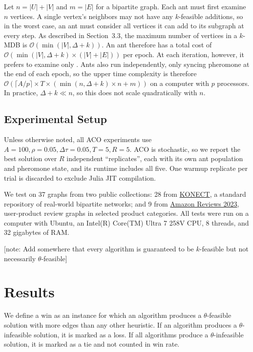 \documentclass[conference]{IEEEtran}
\begin{document}
Let $n = |U| + |V|$ and $m = |E|$ for a bipartite graph. Each ant must first examine $n$ vertices. A single vertex's neighbors may not have any $k$-feasible additions, so in the worst case, an ant must consider all vertices it can add to its subgraph at every step. As described in Section~3.3, the maximum number of vertices in a $k$-MDB is $\mathcal{O}(\min(|V|, \Delta + k))$. An ant therefore has a total cost of $\mathcal{O}(\min(|V|, \Delta + k) \times (|V| + |E|))$ per epoch. At each iteration, however, it prefers to examine only . Ants also run independently, only syncing pheromone at the end of each epoch, so the upper time complexity is therefore $\mathcal{O}(\lceil A / p \rceil \times T \times (\min(n, \Delta + k) \times n + m))$ on a computer with $p$ processors. In practice, $\Delta + k \ll n$, so this does not scale quadratically with $n$.

\subsection{Experimental Setup}


Unless otherwise noted, all ACO experiments use $A = 100, \rho = 0.05, \Delta\tau = 0.05, T = 5, R = 5$. ACO is stochastic, so we report the best solution over $R$ independent ``replicates'', each with its own ant population and pheromone state, and its runtime includes all five. One warmup replicate per trial is discarded to exclude Julia JIT compilation.

We test on 37 graphs from two public collections: 28 from \href{http://konect.cc}{KONECT}, a standard repository of real-world bipartite networks; and 9 from \href{http://amazon-reviews-2023.github.io}{Amazon Reviews 2023}, user-product review graphs in selected product categories. All tests were run on a computer with Ubuntu, an Intel(R) Core(TM) Ultra 7 258V CPU, 8 threads, and 32 gigabytes of RAM.

[note: Add somewhere that every algorithm is guaranteed to be $k$-feasible but not necessarily $\theta$-feasible]

\section{Results}

We define a win as an instance for which an algorithm produces a $\theta$-feasible solution with more edges than any other heuristic. If an algorithm produces a $\theta$-infeasible solution, it is marked as a loss. If all algorithms produce a $\theta$-infeasible solution, it is marked as a tie and not counted in win rate.
\end{document}
